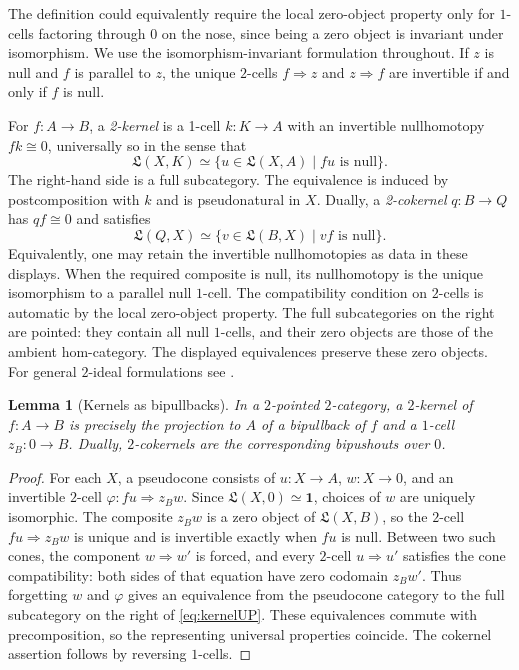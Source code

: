\documentclass[11pt,reqno,a4paper]{amsart}
\newtheorem{lemma}[theorem]{Lemma}
\theoremstyle{definition}
\theoremstyle{remark}
\newcommand{\0}{\mathbf{0}}
\renewcommand{\1}{\mathbf{1}}
\newcommand{\iso}{\cong}
\def\phi{\varphi}
\newcommand{\Lcat}{\mathfrak L}
\begin{document}
The definition could equivalently require the local zero-object
property only for $1$-cells factoring through $0$ on the nose, since
being a zero object is invariant under isomorphism. We use the
isomorphism-invariant formulation throughout. If $z$ is null and
$f$ is parallel to $z$, the unique $2$-cells $f\Rightarrow z$ and
$z\Rightarrow f$ are invertible if and only if $f$ is null.

For $f:A\to B$, a \emph{2-kernel} is a 1-cell $k:K\to A$ with an
invertible nullhomotopy $fk\iso0$, universally so in the sense that
\begin{equation}\label{eq:kernelUP}
 \Lcat(X,K)\simeq
 \{u\in\Lcat(X,A)\mid fu\text{ is null}\}.
\end{equation}
The right-hand side is a full subcategory. The equivalence is induced by
postcomposition with $k$ and is pseudonatural in $X$. Dually, a
\emph{2-cokernel} $q:B\to Q$ has $qf\iso0$ and satisfies
\begin{equation}\label{eq:cokernelUP}
 \Lcat(Q,X)\simeq
 \{v\in\Lcat(B,X)\mid vf\text{ is null}\}.
\end{equation}
Equivalently, one may retain the invertible nullhomotopies as data in
these displays. When the required composite is null, its nullhomotopy
is the unique isomorphism to a parallel null $1$-cell. The compatibility
condition on $2$-cells is automatic by the local zero-object property.
The full subcategories on the right are pointed: they contain all null
$1$-cells, and their zero objects are those of the ambient hom-category.
The displayed equivalences preserve these zero objects. For general
$2$-ideal formulations see \cite[Section 2]{CJM}.

\begin{lemma}[Kernels as bipullbacks]\label{lem:kernel-bipullback}
In a $2$-pointed $2$-category, a $2$-kernel of $f:A\to B$ is
precisely the projection to $A$ of a bipullback of $f$ and a
$1$-cell $z_B:0\to B$. Dually, $2$-cokernels are the
corresponding bipushouts over $0$.
\end{lemma}
\begin{proof}
For each $X$, a pseudocone consists of $u:X\to A$, $w:X\to0$,
and an invertible $2$-cell $\phi:fu\Rightarrow z_Bw$.
Since $\Lcat(X,0)\simeq\mathbf1$, choices of $w$ are uniquely
isomorphic. The composite $z_Bw$ is a zero object of
$\Lcat(X,B)$, so the $2$-cell $fu\Rightarrow z_Bw$ is unique
and is invertible exactly when $fu$ is null. Between two such
cones, the component $w\Rightarrow w'$ is forced, and every
$2$-cell $u\Rightarrow u'$ satisfies the cone compatibility:
both sides of that equation have zero codomain $z_Bw'$.
Thus forgetting $w$ and $\phi$ gives an equivalence from the
pseudocone category to the full subcategory on the right of
\eqref{eq:kernelUP}. These equivalences commute with
precomposition, so the representing universal properties
coincide. The cokernel assertion follows by reversing $1$-cells.
\end{proof}
\end{document}
